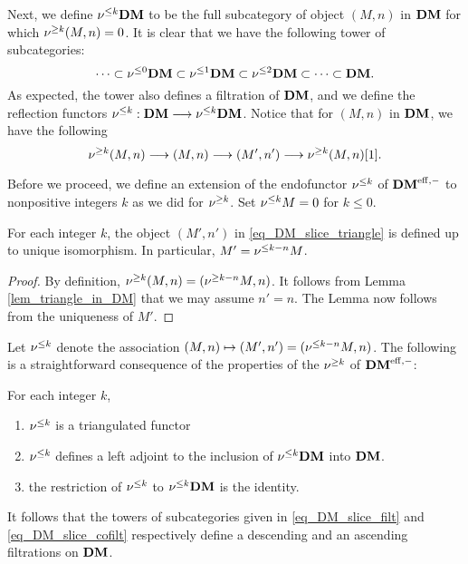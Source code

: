 Next, we define $\nu^{\leq k} \mathbf{DM}$ to be the full subcategory of 
object $(M, n)$ in $\mathbf{DM}$ for which $\nu^{\geq k}(M, n) = 0$. It is
clear that we have the following tower of subcategories:
\begin{equation}\label{eq_DM_slice_cofilt}
\cdots \subset \nu^{\leq 0}\mathbf{DM} \subset \nu^{\leq 1}\mathbf{DM} \subset \nu^{\leq 2}\mathbf{DM} 
   \subset \cdots \subset \mathbf{DM}.
\end{equation}
As expected, the tower also defines a filtration of $\mathbf{DM}$, and
we define the reflection functors $\nu^{\leq k} : \mathbf{DM} \longrightarrow \nu^{\leq k} \mathbf{DM}$.
Notice that for $(M, n)$ in $\mathbf{DM}$, we have the following
\begin{equation}\label{eq_DM_slice_triangle}
\nu^{\geq k} (M, n) \longrightarrow (M, n) \longrightarrow (M', n') \longrightarrow \nu^{\geq k} (M, n)[1].
\end{equation}

Before we proceed, we define an extension of the endofunctor 
$\nu^{\leq k}$ of $\mathbf{DM}^{\mathrm{eff},-}$ to nonpositive integers $k$ as we did for 
$\nu^{\geq k}$. Set $\nu^{\leq k} M = 0$ for $k \leq 0$.

\begin{lem}
For each integer $k$, the object $(M', n')$ in 
\eqref{eq_DM_slice_triangle} is defined up to unique isomorphism. 
In particular, $M' = \nu^{\leq k - n} M$.
\end{lem}
\begin{proof}
By definition, $\nu^{\geq k}(M, n) = (\nu^{\geq k - n}M, n)$. It follows 
from Lemma \ref{lem_triangle_in_DM} that we may assume $n' = n$. 
The Lemma now follows from the uniqueness of $M'$.
\end{proof}

Let $\nu^{\leq k}$ denote the association $(M, n) \mapsto (M', n') =
(\nu^{\leq k - n}M, n)$. The following is a straightforward consequence
of the properties of the $\nu^{\geq k}$ of $\mathbf{DM}^{\mathrm{eff},-}$:

\begin{prop}\label{prop_slDM_functor}
For each integer $k$,
\begin{enumerate}
\item $\nu^{\leq k}$ is a triangulated functor

\item $\nu^{\leq k}$ defines a left adjoint to the inclusion of $\nu^{\leq k}\mathbf{DM}$
into $\mathbf{DM}$.

\item the restriction of $\nu^{\leq k}$ to $\nu^{\leq k}\mathbf{DM}$ is the identity.
\end{enumerate}
\end{prop}

It follows that the towers of subcategories given in 
\eqref{eq_DM_slice_filt} and \eqref{eq_DM_slice_cofilt} 
respectively define a descending and an ascending filtrations on 
$\mathbf{DM}$.

